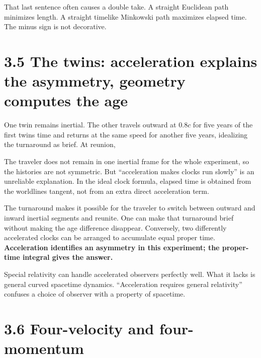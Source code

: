 \documentclass[
  11pt,
  letterpaper,
  oneside,
  openany]{scrbook}
\begin{document}
That last sentence often causes a double take. A straight Euclidean path
minimizes length. A straight timelike Minkowski path maximizes elapsed
time. The minus sign is not decorative.

\hypertarget{the-twins-acceleration-explains-the-asymmetry-geometry-computes-the-age}{%
\section{3.5 The twins: acceleration explains the asymmetry, geometry
computes the
age}\label{the-twins-acceleration-explains-the-asymmetry-geometry-computes-the-age}}

One twin remains inertial. The other travels outward at \(0.8c\) for
five years of the first twin\textquotesingle s time and returns at the
same speed for another five years, idealizing the turnaround as brief.
At reunion,

\begin{center}
\begingroup
{}
\ifdim\wd\grmathbox>\linewidth
\resizebox{\linewidth}{!}{\usebox{\grmathbox}}
\else\usebox{\grmathbox}\fi
\endgroup
\end{center}

The traveler does not remain in one inertial frame for the whole
experiment, so the histories are not symmetric. But ``acceleration makes
clocks run slowly'' is an unreliable explanation. In the ideal clock
formula, elapsed time is obtained from the worldline\textquotesingle s
tangent, not from an extra direct acceleration term.

The turnaround makes it possible for the traveler to switch between
outward and inward inertial segments and reunite. One can make that
turnaround brief without making the age difference disappear.
Conversely, two differently accelerated clocks can be arranged to
accumulate equal proper time. \textbf{Acceleration identifies an
asymmetry in this experiment; the proper-time integral gives the
answer.}

Special relativity can handle accelerated observers perfectly well. What
it lacks is general curved spacetime dynamics. ``Acceleration requires
general relativity'' confuses a choice of observer with a property of
spacetime.

\hypertarget{four-velocity-and-four-momentum}{%
\section{3.6 Four-velocity and
four-momentum}\label{four-velocity-and-four-momentum}}
\end{document}
